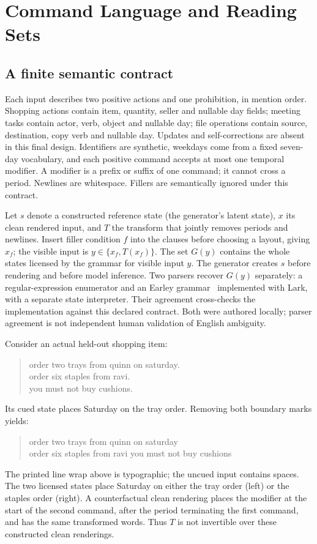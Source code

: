 \documentclass[11pt]{article}
\begin{document}
\section{Command Language and Reading Sets}
\subsection{A finite semantic contract}
Each input describes two positive actions and one prohibition, in mention order. Shopping actions contain item, quantity, seller and nullable day fields; meeting tasks contain actor, verb, object and nullable day; file operations contain source, destination, copy verb and nullable day. Updates and self-corrections are absent in this final design. Identifiers are synthetic, weekdays come from a fixed seven-day vocabulary, and each positive command accepts at most one temporal modifier. A modifier is a prefix or suffix of one command; it cannot cross a period. Newlines are whitespace. Fillers are semantically ignored under this contract.

Let $s$ denote a constructed reference state (the generator's latent state), $x$ its clean rendered input, and $T$ the transform that jointly removes periods and newlines. Insert filler condition $f$ into the clauses before choosing a layout, giving $x_f$; the visible input is $y\in\{x_f,T(x_f)\}$. The set $G(y)$ contains the whole states licensed by the grammar for visible input $y$. The generator creates $s$ before rendering and before model inference. Two parsers recover $G(y)$ separately: a regular-expression enumerator and an Earley grammar\ \cite{Earley_1970} implemented with Lark, with a separate state interpreter. Their agreement cross-checks the implementation against this declared contract. Both were authored locally; parser agreement is not independent human validation of English ambiguity.

Consider an actual held-out shopping item:
\begin{quote}\small\ttfamily
order two trays from quinn on saturday.\\
order six staples from ravi.\\
you must not buy cushions.
\end{quote}
Its cued state places Saturday on the tray order. Removing both boundary marks yields:
\begin{quote}\small\ttfamily
order two trays from quinn on saturday\\
order six staples from ravi you must not buy cushions
\end{quote}
The printed line wrap above is typographic; the uncued input contains spaces. The two licensed states place Saturday on either the tray order (left) or the staples order (right). A counterfactual clean rendering places the modifier at the start of the second command, after the period terminating the first command, and has the same transformed words. Thus $T$ is not invertible over these constructed clean renderings.
\end{document}

